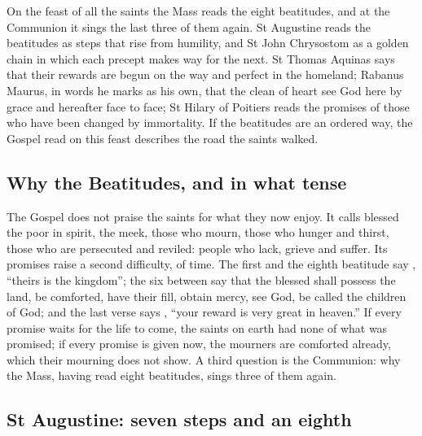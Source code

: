 
On the feast of all the saints the Mass reads the eight beatitudes, and at the
Communion it sings the last three of them again. St Augustine reads the
beatitudes as steps that rise from humility, and St John Chrysostom as a
golden chain in which each precept makes way for the next. St Thomas Aquinas
says that their rewards are begun on the way and perfect in the homeland;
Rabanus Maurus, in words he marks as his own, that the clean of heart see God
here by grace and hereafter face to face; St Hilary of Poitiers reads the
promises of those who have been changed by immortality. If the beatitudes are
an ordered way, the Gospel read on this feast describes the road the saints
walked.

\subsection{Why the Beatitudes, and in what tense}
\label{sec:beatitudes-question}

The Gospel does not praise the saints for what they now enjoy. It calls
blessed the poor in spirit, the meek, those who mourn, those who hunger and
thirst, those who are persecuted and reviled: people who lack, grieve and
suffer. Its promises raise a second difficulty, of time. The first and the
eighth beatitude say , ``theirs is the
kingdom''; the six between say that the blessed shall possess the land, be
comforted, have their fill, obtain mercy, see God, be called the children of
God; and the last verse says ,
``your reward is very great in heaven.'' If every promise waits for the life to
come, the saints on earth had none of what was promised; if every promise is
given now, the mourners are comforted already, which their mourning does not
show. A third question is the Communion: why the Mass, having read eight
beatitudes, sings three of them again.

\subsection{St Augustine: seven steps and an eighth}
\label{sec:beatitudes-augustine}

